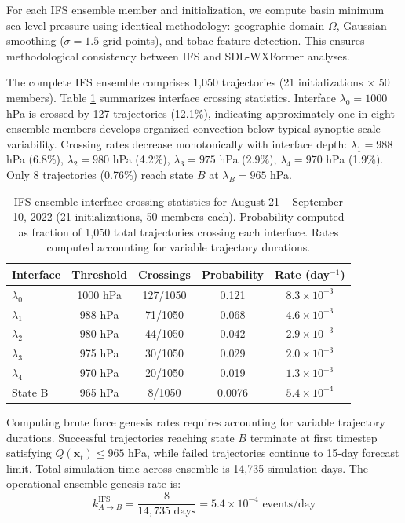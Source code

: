 \documentclass[11pt]{article}
\begin{document}
For each IFS ensemble member and initialization, we compute basin minimum sea-level pressure using identical methodology: geographic domain $\Omega$, Gaussian smoothing ($\sigma = 1.5$ grid points), and tobac feature detection. This ensures methodological consistency between IFS and SDL-WXFormer analyses.

The complete IFS ensemble comprises 1,050 trajectories (21 initializations $\times$ 50 members). Table \ref{tab:ifs_baseline} summarizes interface crossing statistics. Interface $\lambda_0 = 1000$ hPa is crossed by 127 trajectories (12.1\%), indicating approximately one in eight ensemble members develops organized convection below typical synoptic-scale variability. Crossing rates decrease monotonically with interface depth: $\lambda_1 = 988$ hPa (6.8\%), $\lambda_2 = 980$ hPa (4.2\%), $\lambda_3 = 975$ hPa (2.9\%), $\lambda_4 = 970$ hPa (1.9\%). Only 8 trajectories (0.76\%) reach state $B$ at $\lambda_B = 965$ hPa.

\begin{table}[htbp]
\centering
\caption{IFS ensemble interface crossing statistics for August 21 -- September 10, 2022 (21 initializations, 50 members each). Probability computed as fraction of 1,050 total trajectories crossing each interface. Rates computed accounting for variable trajectory durations.}
\label{tab:ifs_baseline}
\begin{tabular}{lcccc}
\toprule
Interface & Threshold & Crossings & Probability & Rate (day$^{-1}$) \\
\midrule
$\lambda_0$ & 1000 hPa & 127/1050 & 0.121 & $8.3 \times 10^{-3}$ \\
$\lambda_1$ & 988 hPa  & 71/1050  & 0.068 & $4.6 \times 10^{-3}$ \\
$\lambda_2$ & 980 hPa  & 44/1050  & 0.042 & $2.9 \times 10^{-3}$ \\
$\lambda_3$ & 975 hPa  & 30/1050  & 0.029 & $2.0 \times 10^{-3}$ \\
$\lambda_4$ & 970 hPa  & 20/1050  & 0.019 & $1.3 \times 10^{-3}$ \\
State B     & 965 hPa  & 8/1050   & 0.0076 & $5.4 \times 10^{-4}$ \\
\bottomrule
\end{tabular}
\end{table}

Computing brute force genesis rates requires accounting for variable trajectory durations. Successful trajectories reaching state $B$ terminate at first timestep satisfying $Q(\mathbf{x}_t) \leq 965$ hPa, while failed trajectories continue to 15-day forecast limit. Total simulation time across ensemble is 14,735 simulation-days. The operational ensemble genesis rate is:
\begin{equation}
k_{A \to B}^{\text{IFS}} = \frac{8}{14{,}735 \text{ days}} = 5.4 \times 10^{-4} \text{ events/day}
\end{equation}
\end{document}
